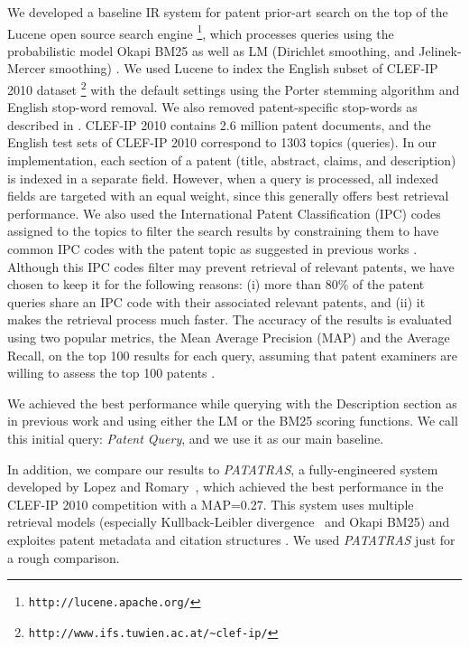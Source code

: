 We developed a baseline IR system for patent prior-art search on the top of
the Lucene open source search engine %
\footnote{\texttt{http://lucene.apache.org/}%
}, which processes queries using the probabilistic
model Okapi BM25 \cite{Robertson1993} as well as LM (Dirichlet
smoothing, and Jelinek-Mercer smoothing) \cite{Zhai2001}. %
We used Lucene to index the English subset of CLEF-IP 2010 dataset%
\footnote{\texttt{http://www.ifs.tuwien.ac.at/\textasciitilde{}clef-ip/}%
} with the default settings using the Porter stemming algorithm \cite{Porter1980} and English stop-word removal. 
We also removed patent-specific stop-words as described in \cite{magdy2012toward}.
CLEF-IP 2010 contains 2.6 million patent documents, and the English
test sets of CLEF-IP 2010 correspond to 1303 topics (queries). In
our implementation, each section of a patent (title, abstract, claims,
and description) is indexed in a separate field. However, when a query 
is processed, all indexed fields are targeted with an equal weight, since this generally
offers best retrieval performance. We also used the International
Patent Classification (IPC) codes assigned to the topics to filter
the search results by constraining them to have common IPC codes with
the patent topic as suggested in previous works \cite{lopez2010patatras}.
Although this IPC codes filter may prevent retrieval of relevant patents, we
have chosen to keep it for the following reasons: (i) more than 80\%
of the patent queries share an IPC code with their associated relevant
patents, and (ii) it makes the retrieval process much faster. The accuracy of the results is evaluated using two popular metrics, the Mean Average Precision (MAP) and the Average Recall, on the top 100 results for each query, assuming that patent examiners are willing to assess the top 100 patents \cite{joho2010survey}. 

We achieved the best performance while querying with the Description
section as in previous work \cite{xue2009transforming} and using
either the LM or the BM25 scoring functions. We call this initial
query: \textit{Patent Query}, and we use it as our main baseline.

In addition, we compare our results to \textit{PATATRAS}, a fully-engineered system developed by Lopez and Romary~\cite{lopez2010patatras}, which achieved the best performance in the CLEF-IP 2010 competition with a MAP=0.27. This system uses multiple retrieval models (especially Kullback-Leibler divergence~\cite{Baeza-Yates2011} and Okapi BM25) and exploites patent metadata and citation structures . We used \textit{PATATRAS} just for a rough comparison.
% 